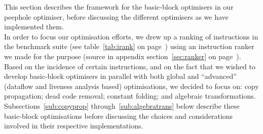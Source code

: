 This section describes the framework for the basic-block optimisers in our
peephole optimiser, before discussing the different optimisers as we have
implemented them.\\

In order to focus our optimisation efforts, we drew up a ranking of instructions
in the benchmark suite (see table~\ref{tab:irank} on page~\pageref{tab:irank})
using an instruction ranker we made for the purpose (source in appendix
section~\ref{sec:ranker} on page~\pageref{sec:ranker}). Based on the incidence
of certain instructions, and on the fact that we wished to develop basic-block
optimisers in parallel with both global and ``advanced'' (dataflow and liveness
analysis based) optimisations, we decided to focus on: copy propagation; dead
code removal; constant folding; and algebraic transformations.
Subsections~\ref{sub:copyprop} through~\ref{sub:algebratrans} below describe
these basic-block optimisations before discussing the choices and considerations
involved in their respective implementations.\\

